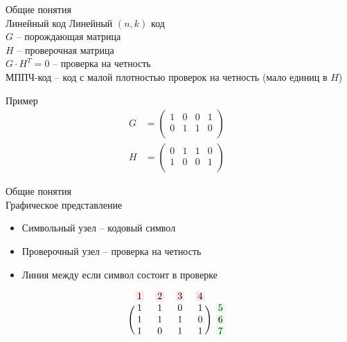 \documentclass[t,13pt,graphics=pdflatex,xcolor=table,aspectratio=43]{beamer}
\newcommand{\inputTikZ}[1]{}
\begin{document}
\begin{frame}{Общие понятия \\ Линейный код}
  Линейный $(n, k)$ код \\
  $G$ -- порождающая матрица \\
  $H$ -- проверочная матрица \\
  $G \cdot H^T = 0$ -- проверка на четность \\ МППЧ-код -- код с малой плотностью проверок на четность (мало единиц в $H$) \\ 

\begin{exampleblock}{Пример}
\begin{align*}
    G&=
    \begin{pmatrix}
        1&0&0&   1\\
        0&1&1& 0\\
    \end{pmatrix} \text{  } \\
    H&=
    \begin{pmatrix}
        0&1&1&0 \\
        1&0&0&1 \\
    \end{pmatrix} \text{  } 
\end{align*}
\end{exampleblock}
\end{frame}
\newcommand\colorBox[2]{\setlength{\fboxsep}{2pt}\colorbox{#1!10}{#2}}
\begin{frame}{Общие понятия \\ Графическое представление}
\begin{itemize}
  \item Символьный узел -- кодовый символ 
  \item Проверочный узел -- проверка на четность 
  \item Линия между если символ состоит в проверке
\end{itemize}
\begin{minipage}[c]{.3\textwidth}
  \[
    \begin{blockarray}{ccccc}
        \colorBox{red}{1} & \colorBox{red}{2} & \colorBox{red}{3} & \colorBox{red}{4} \\
        \begin{block}{(cccc)c}
            1&1&0&1&\colorBox{green}{5}\\
            1&1&1&0&\colorBox{green}{6}\\
            1&0&1&1&\colorBox{green}{7} \\
        \end{block}
    \end{blockarray}
  \]
\end{minipage}
\begin{minipage}[c]{.68\textwidth}
\begin{figure}[!h]
  \centering
  \inputTikZ{../tikz/ex_graph1}
  \label{fig1}
\end{figure}
\end{minipage}
\end{frame}
\end{document}
